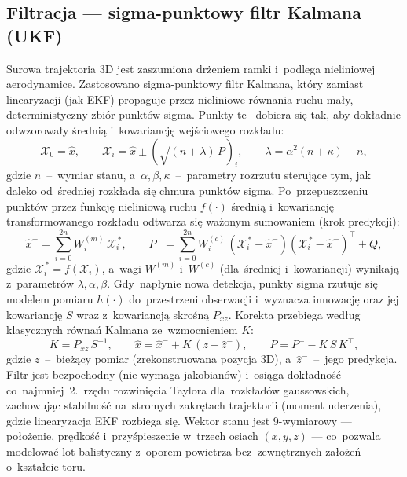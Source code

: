 \documentclass[14pt,a4paper]{extarticle}
\begin{document}
\subsection{Filtracja — sigma-punktowy filtr Kalmana (UKF)}
Surowa trajektoria 3D jest zaszumiona drżeniem ramki i~podlega nieliniowej aerodynamice.
Zastosowano sigma-punktowy filtr Kalmana, który zamiast linearyzacji (jak EKF) propaguje
przez nieliniowe równania ruchu mały, deterministyczny zbiór punktów sigma. Punkty te~
dobiera się tak, aby dokładnie odwzorowały średnią i~kowariancję wejściowego rozkładu:
\begin{equation}
\mathcal{X}_0 = \hat{x}, \qquad
\mathcal{X}_i = \hat{x} \pm \left(\sqrt{(n+\lambda)\,P}\right)_i, \qquad
\lambda = \alpha^2 (n+\kappa) - n,
\end{equation}
gdzie $n$~--~wymiar stanu, a~$\alpha,\beta,\kappa$~--~parametry rozrzutu sterujące tym, jak
daleko od~średniej rozkłada się chmura punktów sigma. Po~przepuszczeniu punktów przez
funkcję nieliniową ruchu $f(\cdot)$ średnią i~kowariancję transformowanego rozkładu
odtwarza się ważonym sumowaniem (krok predykcji):
\begin{equation}
\hat{x}^- = \sum_{i=0}^{2n} W_i^{(m)}\,\mathcal{X}_i^{\,*}, \qquad
P^- = \sum_{i=0}^{2n} W_i^{(c)}\,(\mathcal{X}_i^{\,*}-\hat{x}^-)(\mathcal{X}_i^{\,*}-\hat{x}^-)^{\!\top} + Q,
\end{equation}
gdzie $\mathcal{X}_i^{\,*}=f(\mathcal{X}_i)$, a~wagi $W^{(m)}$ i~$W^{(c)}$ (dla~średniej i~kowariancji)
wynikają z~parametrów $\lambda,\alpha,\beta$. Gdy~napłynie nowa detekcja, punkty sigma rzutuje
się modelem pomiaru $h(\cdot)$ do~przestrzeni obserwacji i~wyznacza innowację oraz jej
kowariancję $S$ wraz z~kowariancją skrośną $P_{xz}$. Korekta przebiega według klasycznych
równań Kalmana ze~wzmocnieniem $K$:
\begin{equation}
K = P_{xz}\,S^{-1}, \qquad
\hat{x} = \hat{x}^- + K\,(z - \hat{z}^-), \qquad
P = P^- - K\,S\,K^{\!\top},
\end{equation}
gdzie $z$~--~bieżący pomiar (zrekonstruowana pozycja 3D), a~$\hat{z}^-$~--~jego predykcja.
Filtr jest bezpochodny (nie wymaga jakobianów) i~osiąga dokładność co~najmniej~2.~rzędu
rozwinięcia Taylora dla~rozkładów gaussowskich, zachowując stabilność na~stromych zakrętach
trajektorii (moment uderzenia), gdzie linearyzacja EKF rozbiega się. Wektor stanu jest
9-wymiarowy --- położenie, prędkość i~przyśpieszenie w~trzech osiach $(x,y,z)$ --- co~pozwala
modelować lot balistyczny z~oporem powietrza bez~zewnętrznych założeń o~kształcie toru.
\end{document}
